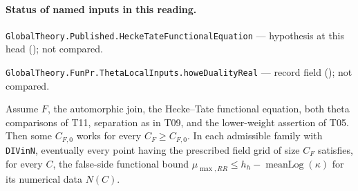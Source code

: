 

\paragraph{Status of named inputs in this reading.}
\noindent\nolinkurl{GlobalTheory.Published.HeckeTateFunctionalEquation} --- hypothesis at this head (); not compared.\par
\noindent\nolinkurl{GlobalTheory.FunPr.ThetaLocalInputs.howeDualityReal} --- record field (); not compared.\par

\begin{formalstatement}\label{sub:T10}

Assume $F$, the automorphic join, the Hecke--Tate functional equation, both
theta comparisons of T11, separation as in T09, and the lower-weight
assertion of T05. Then some $C_{F,0}$ works for every $C_F\ge C_{F,0}$.
In each admissible family with \nolinkurl{DIVinN}, eventually every point
having the prescribed field grid of size $C_F$ satisfies, for every $C$,
the false-side functional bound
$\mu_{\max,RR}\le h_h-\operatorname{meanLog}(\kappa)$
for its numerical data $N(C)$.

\end{formalstatement}
